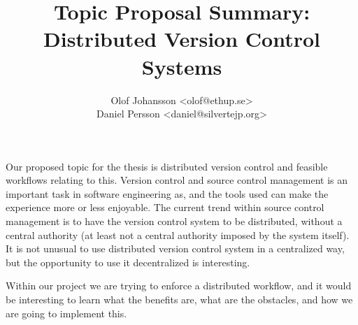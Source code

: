 \documentclass{article}
\title{Topic Proposal Summary: \\ Distributed Version Control Systems}
\author{
	Olof Johansson  \textless olof@ethup.se\textgreater \\
	Daniel Persson \textless daniel@silvertejp.org\textgreater
}
\begin{document}
	\maketitle
	
	Our proposed topic for the thesis is distributed version control and 
	feasible workflows relating to this. Version control and source control
	management is an important task in software engineering as, and the tools
	used can make the experience more or less enjoyable. The current trend
	within source control management is to have the version control system
	to be distributed, without a central authority (at least not a central
	authority imposed by the system itself). It is not unusual to use 
	distributed version control system in a centralized way, but the 
	opportunity to use it decentralized is interesting. 

	Within our project we are trying to enforce a distributed workflow, and
	it would be interesting to learn what the benefits are, what are the
	obstacles, and how we are going to implement this.
\end{document}
